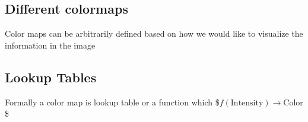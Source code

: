 \documentclass[letterpaper,10pt,english]{sphinxmanual}
\begin{document}
\subsection{Different colormaps}
\label{\detokenize{01-Introduction:different-colormaps}}
\sphinxAtStartPar
Color maps can be arbitrarily defined based on how we would like to visualize the information in the image

\begin{sphinxVerbatim}[commandchars=\\\{\}]
     
\end{sphinxVerbatim}

\begin{sphinxVerbatim}[commandchars=\\\{\}]
     
\end{sphinxVerbatim}


\subsection{Lookup Tables}
\label{\detokenize{01-Introduction:lookup-tables}}
\sphinxAtStartPar
Formally a color map is lookup table or a function which
\$\( f(\textrm{Intensity}) \rightarrow \textrm{Color} \)\$
\end{document}
